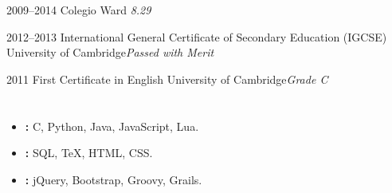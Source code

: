 \documentclass[11pt,a4paper]{moderncv}
\begin{document}
\cventry
    {2009--2014}
    {}
    {Colegio Ward}{}{}{\textit{ 8.29}}

\cventry
    {2012--2013}
    {International General Certificate of Secondary Education (IGCSE)}
    {University of Cambridge}{}{}{\textit{Passed with Merit}}

\cventry
    {2011}
    {First Certificate in English}
    {University of Cambridge}{}{}{\textit{Grade C}}

\section{}

\begin{itemize}
\item \textbf{:} C, Python, Java, JavaScript, Lua.
\item \textbf{:} SQL, TeX, HTML, CSS.
\item \textbf{:} jQuery, Bootstrap, Groovy, Grails.
\end{itemize}

\end{document}
